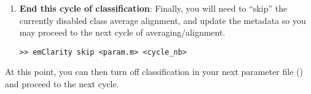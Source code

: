 \begin{enumerate}
    \item \textbf{End this cycle of classification}: Finally, you will need to ``skip'' the currently disabled class average alignment, and
    update the metadata so you may proceed to the next cycle of averaging/alignment.
\begin{lstlisting}
>> emClarity skip <param.m> <cycle_nb>
\end{lstlisting}
\end{enumerate}

At this point, you can then turn off classification in your next parameter file () and proceed to the next cycle.